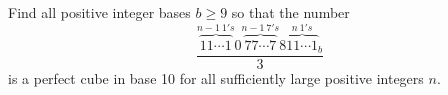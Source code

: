 Find all positive integer bases $b \ge 9$ so that the number
\[ \frac{{\overbrace{11 \cdots 1}^{n-1 \ 1's}0\overbrace{77 \cdots 7}^{n-1\ 7's}8\overbrace{11 \cdots 1}^{n \ 1's}}_b}{3} \]
is a perfect cube in base 10 for all sufficiently large positive integers $n$.

